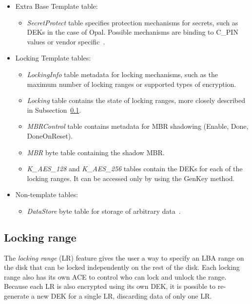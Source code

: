 \begin{itemize}
    \item Extra Base Template table:
    \begin{itemize}
        \item \emph{SecretProtect} table specifies protection mechanisms for secrets, such as DEKs in the case of Opal. Possible mechanisms are binding to C\_PIN values or vendor specific~\cite{tcg-secrets}.
    \end{itemize}
    \item Locking Template tables:
    \begin{itemize}
        \item \emph{LockingInfo} table metadata for locking mechanisms, such as the maximum number of locking ranges or supported types of encryption. 
        \item \emph{Locking} table contains the state of locking ranges, more closely described in Subsection~\ref{locking_range}.
        \item \emph{MBRControl} table contains metadata for MBR shadowing (Enable, Done, DoneOnReset).
        \item \emph{MBR} byte table containing the shadow MBR.
        \item \emph{K\_AES\_128} and \emph{K\_AES\_256} tables contain the DEKs for each of the locking ranges. It can be accessed only by using the GenKey method.
    \end{itemize}
    \item Non-template tables:
    \begin{itemize}
        \item \emph{DataStore} byte table for storage of arbitrary data~\cite{tcg-additional-datastore}.
    \end{itemize}
\end{itemize}

\subsection{Locking range}
\label{locking_range}

The \emph{locking range} (LR) feature gives the user a way to specify an LBA range on the disk that can be locked independently on the rest of the disk. Each locking range also has its own ACE to control who can lock and unlock the range. Because each LR is also encrypted using its own DEK, it is possible to re-generate a new DEK for a single LR, discarding data of only one LR.


